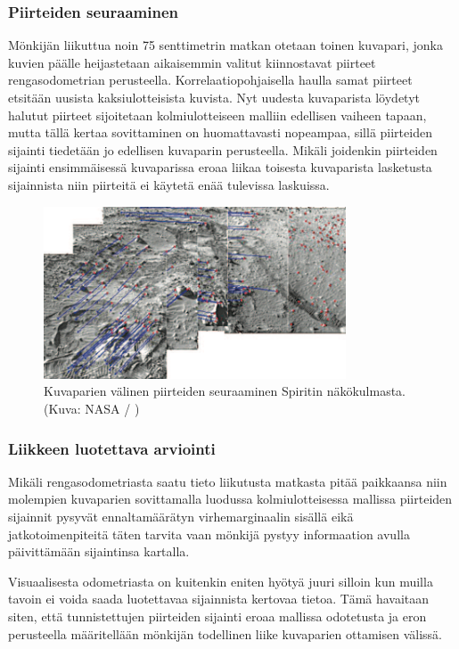 \documentclass[finnish]{tktltiki2}
\theoremstyle{definition}
\theoremstyle{remark}
\begin{document}
\subsubsection{Piirteiden seuraaminen}
Mönkijän liikuttua noin 75 senttimetrin matkan otetaan toinen kuvapari, jonka kuvien päälle heijastetaan aikaisemmin valitut kiinnostavat piirteet rengasodometrian perusteella. Korrelaatiopohjaisella haulla samat piirteet etsitään uusista kaksiulotteisista kuvista. Nyt uudesta kuvaparista löydetyt halutut piirteet sijoitetaan kolmiulotteiseen malliin edellisen vaiheen tapaan, mutta tällä kertaa sovittaminen on huomattavasti nopeampaa, sillä piirteiden sijainti tiedetään jo edellisen kuvaparin perusteella. Mikäli joidenkin piirteiden sijainti ensimmäisessä kuvaparissa eroaa liikaa toisesta kuvaparista lasketusta sijainnista niin piirteitä ei käytetä enää tulevissa laskuissa.\cite{cheng2005visual}

\begin{figure}[H]
	\centering
		\includegraphics[width=0.8\textwidth]{feature_tracking}
	\caption{Kuvaparien välinen piirteiden seuraaminen Spiritin näkökulmasta. (Kuva: NASA / \cite{cheng2005visual})}
\end{figure}

\subsubsection{Liikkeen luotettava arviointi}
Mikäli rengasodometriasta saatu tieto liikutusta matkasta pitää paikkaansa niin molempien kuvaparien sovittamalla luodussa kolmiulotteisessa mallissa piirteiden sijainnit pysyvät ennaltamäärätyn virhemarginaalin sisällä eikä jatkotoimenpiteitä täten tarvita vaan mönkijä pystyy informaation avulla päivittämään sijaintinsa kartalla. 

Visuaalisesta odometriasta on kuitenkin eniten hyötyä juuri silloin kun muilla tavoin ei voida saada luotettavaa sijainnista kertovaa tietoa. Tämä havaitaan siten, että tunnistettujen piirteiden sijainti eroaa mallissa odotetusta ja eron perusteella määritellään mönkijän todellinen liike kuvaparien ottamisen välissä.
\end{document}
